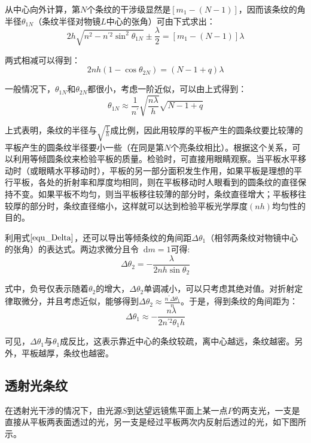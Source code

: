 \documentclass[UTF8]{ctexart}
\newcommand*{\dif}{\mathop{}\!\mathrm{d}}
\begin{document}
\noindent 从中心向外计算，第$ N $个条纹的干涉级显然是$ \left[m_{1}-(N-1)\right] $，因而该条纹的角半径$ \theta_{1N} $（条纹半径对物镜$ L $中心的张角）可由下式求出：
\begin{equation}
	2 h \sqrt{n^{2}-n^{\prime 2} \sin ^{2} \theta_{1 N}} \pm \frac{\lambda}{2}=\left[m_{1}-(N-1)\right] \lambda
\end{equation}

\noindent 两式相减可以得到：
\begin{equation}
	2 n h\left(1-\cos \theta_{2 N}\right)=( N-1+q) \lambda
\end{equation}

\noindent 一般情况下，$ \theta_{1 N} $和$ \theta_{2N} $都很小，考虑一阶近似，可以由上式得到：
\begin{equation}
	\theta_{ 1 N} \approx \frac{1}{n^{\prime}} \sqrt{\frac{n \lambda}{h}} \sqrt{N-1+q}
\end{equation}

\noindent 上式表明，条纹的半径与$ \sqrt{\frac{1}{h}} $成比例，因此用较厚的平板产生的圆条纹要比较薄的平板产生的圆条纹半径要小一些（在同是第$ N $个亮条纹相比）。根据这个关系，可以利用等倾圆条纹来检验平板的质量。检验时，可直接用眼睛观察。当平板水平移动时（或眼睛水平移动时），平板的另一部分面积发生作用，如果平板是理想的平行平板，各处的折射率和厚度均相同，则在平板移动时人眼看到的圆条纹的直径保持不变。如果平板不均匀，则当平板移往较薄的部分时，条纹直径增大；平板移往较厚的部分时，条纹直径缩小，这样就可以达到检验平板光学厚度$ (nh) $均匀性的目的。

	利用式$ \ref{equ_Delta} $，还可以导出等倾条纹的角间距$ \Delta \theta_{1} $（相邻两条纹对物镜中心的张角）的表达式。两边求微分且令$ \dif m=1 $可得:
	\begin{equation}
		\Delta \theta_{2} = - \frac{\lambda}{2 n h \sin \theta_{2}}
	\end{equation}
	
\noindent 式中，负号仅表示随着$ \theta_{2} $的增大，$ \Delta \theta_{2} $单调减小，可以只考虑其绝对值。对折射定律取微分，并且考虑近似，能够得到$ \Delta \theta_{2} \approx \frac{n^{\prime} \Delta \theta_{1}}{n} $。于是，得到条纹的角间距为：
	\begin{equation}
	\Delta \theta_{1} \approx-\frac{n \lambda}{2 n^{\prime 2} \theta_{1} h}
	\end{equation}
	
\noindent 可见，$ \Delta \theta_{1} $与$ \theta_{1} $成反比，这表示靠近中心的条纹较疏，离中心越远，条纹越密。另外，平板越厚，条纹也越密。

	\subsection{透射光条纹}
	在透射光干涉的情况下，由光源$ S $到达望远镜焦平面上某一点$ P $的两支光，一支是直接从平板两表面透过的光，另一支是经过平板两次内反射后透过的光，如下图所示。
	
\end{document}
